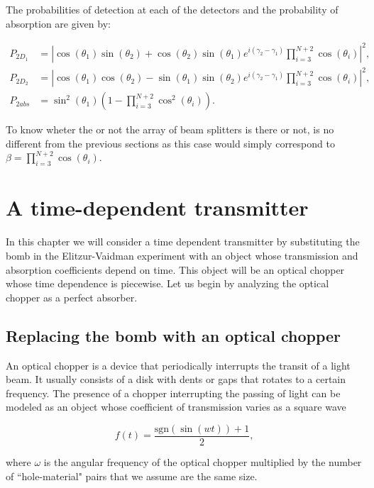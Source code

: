 \documentclass[12pt]{book}
\begin{document}
The probabilities of detection at each of the detectors and the probability of absorption are given by:

\begin{align}
P_{2D_{1}}&=|\cos(\theta_{1})\sin(\theta_{2})+\cos(\theta_{2})\sin(\theta_{1})e^{i (\gamma_{2}-\gamma_{1})}\prod_{i=3}^{N+2} \cos(\theta_{i})|^2,\\
P_{2D_{2}}&=|\cos(\theta_{1})\cos(\theta_{2})-\sin(\theta_{1})\sin(\theta_{2})e^{i (\gamma_{2}-\gamma_{1})}\prod_{i=3}^{N+2} \cos(\theta_{i})|^2,\\
P_{2abs}&=\sin^2(\theta_{1})\left(1-\prod_{i=3}^{N+2}\cos^2(\theta_{i})\right).
\end{align}


To know wheter the or  not the array of beam splitters is there or not, is no different from the previous sections as this case would simply correspond to $\beta=\prod_{i=3}^{N+2} \cos(\theta_{i})$.


\chapter{A time-dependent transmitter}

In this chapter we will consider a time dependent transmitter by substituting the bomb in the Elitzur-Vaidman experiment with an object whose transmission and absorption coefficients depend on time. This object will be an optical chopper whose time dependence is piecewise. Let us begin by analyzing the optical chopper as a perfect absorber.

\section{Replacing the bomb with an optical chopper }
 

An optical chopper is a device that periodically interrupts the transit of a light beam. It usually consists of a disk with dents or gaps that rotates to a certain frequency. The presence of a chopper interrupting the passing of light can be modeled as an object whose coefficient of transmission  varies as a square wave  

\begin{equation}
f(t)=\frac{\mathrm{sgn}(\sin(wt))+1}{2},
\end{equation}

 where $\omega$ is the angular frequency of the optical chopper multiplied by the number of ``hole-material" pairs that we assume are the same size.
\end{document}
